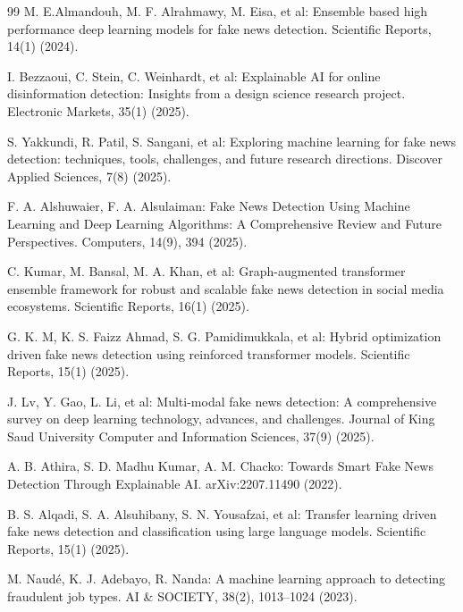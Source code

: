 \documentclass[runningheads]{llncs}
\begin{document}
\begin{thebibliography}{99}
M. E.Almandouh, M. F. Alrahmawy, M. Eisa, et al: Ensemble based high performance deep learning models for fake news detection. Scientific Reports, 14(1) (2024). 

I. Bezzaoui, C. Stein, C. Weinhardt, et al: Explainable AI for online disinformation detection: Insights from a design science research project. Electronic Markets, 35(1) (2025). 

S. Yakkundi, R. Patil, S. Sangani, et al: Exploring machine learning for fake news detection: techniques, tools, challenges, and future research directions. Discover Applied Sciences, 7(8) (2025). 

F. A. Alshuwaier, F. A. Alsulaiman: Fake News Detection Using Machine Learning and Deep Learning Algorithms: A Comprehensive Review and Future Perspectives. Computers, 14(9), 394 (2025). 

C. Kumar, M. Bansal, M. A. Khan, et al: Graph-augmented transformer ensemble framework for robust and scalable fake news detection in social media ecosystems. Scientific Reports, 16(1) (2025). 

G. K. M, K. S. Faizz Ahmad, S. G. Pamidimukkala, et al: Hybrid optimization driven fake news detection using reinforced transformer models. Scientific Reports, 15(1) (2025). 

J. Lv, Y. Gao, L. Li, et al: Multi-modal fake news detection: A comprehensive survey on deep learning technology, advances, and challenges. Journal of King Saud University Computer and Information Sciences, 37(9) (2025). 

A. B. Athira, S. D. Madhu Kumar, A. M. Chacko: Towards Smart Fake News Detection Through Explainable AI. arXiv:2207.11490 (2022). 

B. S. Alqadi, S. A. Alsuhibany, S. N. Yousafzai, et al: Transfer learning driven fake news detection and classification using large language models. Scientific Reports, 15(1) (2025). 

M. Naudé, K. J. Adebayo, R. Nanda: A machine learning approach to detecting fraudulent job types. AI & SOCIETY, 38(2), 1013–1024 (2023). 


\end{thebibliography}
\end{document}
